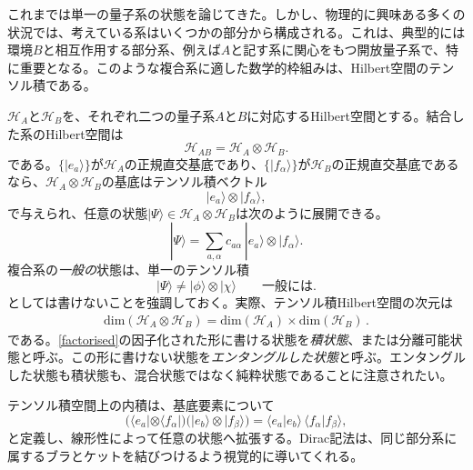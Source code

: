 \documentclass[a4paper,11pt,oneside]{article}
\theoremstyle{definition}
\numberwithin{equation}{section}
\begin{document}
これまでは単一の量子系の状態を論じてきた。しかし、物理的に興味ある多くの状況では、考えている系はいくつかの部分から構成される。これは、典型的には環境$B$と相互作用する部分系、例えば$A$と記す系に関心をもつ開放量子系で、特に重要となる。このような複合系に適した数学的枠組みは、Hilbert空間のテンソル積である。



$\mathcal H_A$と$\mathcal H_B$を、それぞれ二つの量子系$A$と$B$に対応するHilbert空間とする。結合した系のHilbert空間は
\begin{equation}
\mathcal H_{AB} = \mathcal H_A \otimes \mathcal H_B .
\end{equation}
である。$\{|e_a\rangle\}$が$\mathcal H_A$の正規直交基底であり、$\{|f_\alpha\rangle\}$が$\mathcal H_B$の正規直交基底であるなら、$\mathcal H_A \otimes \mathcal H_B$の基底はテンソル積ベクトル
\begin{equation}
|e_a\rangle \otimes |f_\alpha\rangle ,
\end{equation}
で与えられ、任意の状態$|\Psi\rangle \in \mathcal H_A \otimes \mathcal H_B$は次のように展開できる。
\begin{equation}
|\Psi\rangle
=
\sum_{a,\alpha} c_{a\alpha} \, |e_a\rangle \otimes |f_\alpha\rangle .
\end{equation}
複合系の\textit{一般の}状態は、単一のテンソル積
\begin{equation}\label{factorised}
|\Psi\rangle \neq |\phi\rangle \otimes |\chi\rangle
\qquad \text{一般には}.
\end{equation}
としては書けないことを強調しておく。実際、テンソル積Hilbert空間の次元は
\begin{align}
\text{dim}(\mathcal H_A \otimes \mathcal H_B)=\text{dim}(\mathcal H_A) \times\text{dim}(\mathcal H_B)\,.
\end{align}
である。\eqref{factorised}の因子化された形に書ける状態を\textit{積状態}、または分離可能状態と呼ぶ。この形に書けない状態を\textit{エンタングルした状態}と呼ぶ。エンタングルした状態も積状態も、混合状態ではなく純粋状態であることに注意されたい。



テンソル積空間上の内積は、基底要素について
\begin{equation}
\bigl(
\langle e_a| \otimes \langle f_\alpha|
\bigr)
\bigl(
|e_b\rangle \otimes |f_\beta\rangle
\bigr)
=
\langle e_a|e_b\rangle \, \langle f_\alpha|f_\beta\rangle ,
\end{equation}
と定義し、線形性によって任意の状態へ拡張する。Dirac記法は、同じ部分系に属するブラとケットを結びつけるよう視覚的に導いてくれる。
\end{document}
